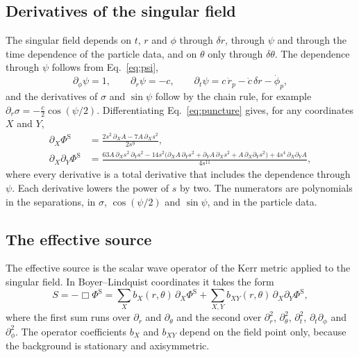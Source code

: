 \documentclass[11pt]{article}
\newcommand{\PhiS}{\Phi^{\mathrm{S}}}
\begin{document}
\subsection{Derivatives of the singular field}

The singular field depends on $t$, $r$ and $\phi$ through $\delta r$, through
$\psi$ and through the time dependence of the particle data, and on $\theta$
only through $\delta\theta$. The dependence through $\psi$ follows from
Eq.~\eqref{eq:psi},
\begin{equation}
  \label{eq:dpsi}
  \partial_\phi\psi=1, \qquad \partial_r\psi=-c, \qquad
  \partial_t\psi = c\,\dot r_p - \dot c\,\delta r - \dot\phi_p ,
\end{equation}
and the derivatives of $\sigma$ and $\sin\psi$ follow by the chain rule, for
example $\partial_r\sigma=-\tfrac{c}{2}\cos(\psi/2)$. Differentiating
Eq.~\eqref{eq:puncture} gives, for any coordinates $X$ and $Y$,
\begin{align}
  \partial_X\PhiS &= \frac{2s^2\,\partial_X A - 7A\,\partial_X s^2}{2s^9}, \label{eq:first}\\
  \partial_X\partial_Y\PhiS &= \frac{63A\,\partial_X s^2\,\partial_Y s^2
    - 14s^2\bigl(\partial_X A\,\partial_Y s^2 + \partial_Y A\,\partial_X s^2 + A\,\partial_X\partial_Y s^2\bigr)
    + 4s^4\,\partial_X\partial_Y A}{4s^{11}}, \label{eq:second}
\end{align}
where every derivative is a total derivative that includes the dependence
through $\psi$. Each derivative lowers the power of $s$ by two. The numerators
are polynomials in the separations, in $\sigma$, $\cos(\psi/2)$ and $\sin\psi$,
and in the particle data.

\subsection{The effective source}

The effective source is the scalar wave operator of the Kerr metric applied to
the singular field. In Boyer--Lindquist coordinates it takes the form
\begin{equation}
  \label{eq:source}
  S = -\Box\PhiS = \sum_X b_X(r,\theta)\,\partial_X\PhiS
    + \sum_{X,Y} b_{XY}(r,\theta)\,\partial_X\partial_Y\PhiS,
\end{equation}
where the first sum runs over $\partial_r$ and $\partial_\theta$ and the second
over $\partial_r^2$, $\partial_\theta^2$, $\partial_t^2$, $\partial_t\partial_\phi$
and $\partial_\phi^2$. The operator coefficients $b_X$ and $b_{XY}$ depend on
the field point only, because the background is stationary and axisymmetric.
\end{document}
